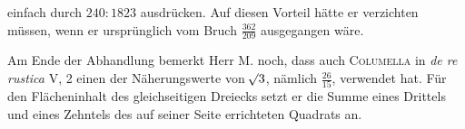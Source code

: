 %
einfach durch \(240:1823\) ausdrücken. Auf diesen Vorteil hätte er verzichten müssen, wenn er ursprünglich vom Bruch \(\frac{362}{209}\) ausgegangen wäre.

Am Ende der Abhandlung bemerkt Herr M. noch, dass auch \textsc{Columella} in \textit{de re rustica} V, 2 einen der Näherungswerte von \(\mathord{{}^{}\!\surd}3\), nämlich \(\frac{26}{15}\), verwendet hat. Für den Flächeninhalt des gleichseitigen Dreiecks setzt er die Summe eines Drittels und eines Zehntels des auf seiner Seite errichteten Quadrats an.

